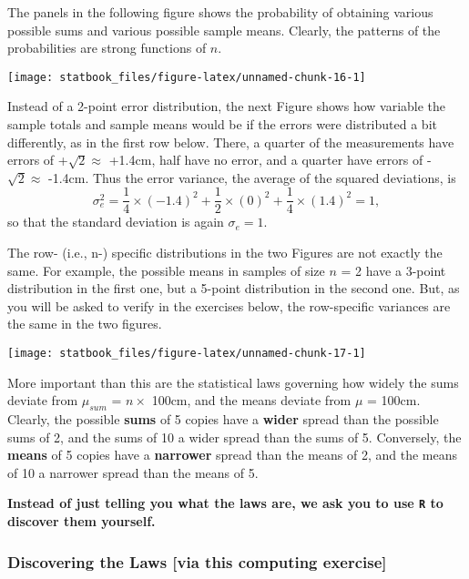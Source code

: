 \documentclass[]{book}
\begin{document}
The panels in the following figure shows the probability of obtaining various possible sums and various possible sample means. Clearly, the patterns of the probabilities are strong functions of \(n.\)

\begin{center}\texttt{[image: statbook\_files/figure-latex/unnamed-chunk-16-1]} \end{center}

Instead of a 2-point error distribution, the next Figure shows how variable the sample totals and sample means would be if the errors were distributed a bit differently, as in the first row below. There, a quarter of the measurements have errors of +\(\sqrt{2} \approx\) +1.4cm, half have no error, and a quarter have errors of -\(\sqrt{2} \approx\) -1.4cm. Thus the error variance, the average of the squared deviations, is
\[\sigma_e^2 = \frac{1}{4} \times (-1.4)^2  +  \frac{1}{2} \times (0)^2 +  \frac{1}{4} \times (1.4)^2 = 1,\] so that the standard deviation is again \(\sigma_e = 1.\)

The row- (i.e., n-) specific distributions in the two Figures are not exactly the same. For example, the possible means in samples of size \(n\) = 2 have a 3-point distribution in the first one, but a 5-point distribution in the second one. But, as you will be asked to verify in the exercises below, the row-specific variances are the same in the two figures.

\begin{center}\texttt{[image: statbook\_files/figure-latex/unnamed-chunk-17-1]} \end{center}

More important than this are the statistical laws governing how widely the sums deviate from \(\mu_{sum}\) = \(n \times\) 100cm, and the means deviate from \(\mu\) = 100cm. Clearly, the possible \textbf{sums} of 5 copies have a \textbf{wider} spread than the possible sums of 2, and the sums of 10 a wider spread than the sums of 5. Conversely, the \textbf{means} of 5 copies have a \textbf{narrower} spread than the means of 2, and the means of 10 a narrower spread than the means of 5.

\textbf{Instead of just telling you what the laws are, we ask you to use \texttt{R} to discover them yourself.}

\hypertarget{discovering-the-laws-via-this-computing-exercise}{%
\subsubsection{Discovering the Laws {[}via this computing exercise{]}}\label{discovering-the-laws-via-this-computing-exercise}}
\end{document}
